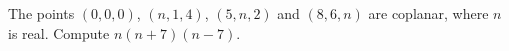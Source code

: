 The points $(0,0,0)$, $(n,1,4)$, $(5,n,2)$ and $(8,6,n)$ are coplanar, where $n$ is real. Compute $n(n+7)(n-7)$.
